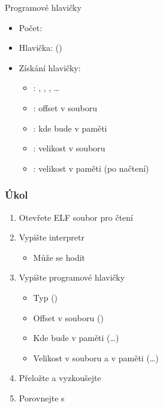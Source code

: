 \begin{frame}{}{Programové hlavičky}

  \begin{itemize}
    \item Počet: 
    \item Hlavička:  ()
    \item Získání hlavičky: \\ \small
    \begin{itemize}
      \item {}: , , ,
        \dots
      \item {}: offset v souboru
      \item {}: kde bude v paměti
      \item {}: velikost v souboru
      \item {}: velikost v paměti (po načtení)
    \end{itemize}
  \end{itemize}

\end{frame}

\begin{frame}
  \frametitle{Úkol}

  \begin{enumerate}
    \item Otevřete ELF soubor pro čtení
    \item Vypište interpretr
    \begin{itemize}
      \item Může se hodit 
    \end{itemize}

    \item Vypište programové hlavičky
    \begin{itemize}
      \item Typ ()
      \item Offset v souboru ()
      \item Kde bude v paměti (\dots)
      \item Velikost v souboru a v paměti (\dots)
    \end{itemize}

    \item Přeložte a vyzkoušejte
    \item Porovnejte s 
  \end{enumerate}

\end{frame}
